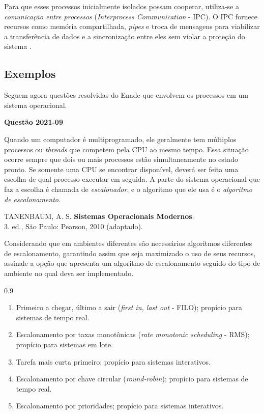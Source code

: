 \documentclass[12pt,a4paper]{article}
\newenvironment{Question}[1]{%
    \pdfbookmark[3]{Questão #1}{q:#1}
    \label{q:#1}
    \par\bigskip\noindent
    \textbf{Questão #1} \dotfill
    \par\noindent
    \nopagebreak
    \ignorespaces
}{%
    \noindent\dotfill
}
\newenvironment{QuestionOptions}{%
    \begin{spacing}{0.9}%
    \small
    \begin{enumerate}[label=\Alph*)]
}{%
    \end{enumerate}
    \end{spacing}
}
\begin{document}
Para que esses processos inicialmente isolados possam cooperar,
utiliza-se a \emph{comunicação entre processos} (\textit{Interprocess Communication} - IPC).
O IPC fornece recursos como memória compartilhada, \textit{pipes} e troca de mensagens
para viabilizar a transferência de dados e a sincronização entre eles sem violar a proteção do sistema \parencite[seç.~2.3]{tanenbaum2016}.

\subsection{Exemplos}
Seguem agora questões resolvidas do Enade que envolvem os processos em um sistema operacional.

\begin{Question}{2021-09}
Quando um computador é multiprogramado, ele geralmente tem múltiplos processos ou \textit{threads} que competem pela CPU ao mesmo tempo.
Essa situação ocorre sempre que dois ou mais processos estão simultaneamente no estado pronto.
Se somente uma CPU se encontrar disponível, deverá ser feita uma escolha de qual processo executar em seguida.
A parte do sistema operacional que faz a escolha é chamada de \emph{escalonador},
e o algoritmo que ele usa é o \emph{algoritmo de escalonamento}.
\vspace{-0.5em}
\begin{flushright}
    \scriptsize
    TANENBAUM, A. S. \textbf{Sistemas Operacionais Modernos}.\\
    3. ed., São Paulo: Pearson, 2010 (adaptado).
\end{flushright}
Considerando que em ambientes diferentes são necessários algoritmos diferentes de escalonamento,
garantindo assim que seja maximizado o uso de seus recursos,
assinale a opção que apresenta um algoritmo de escalonamento seguido do tipo de ambiente no qual deva ser implementado.
\begin{QuestionOptions}
    \item Primeiro a chegar, último a sair (\textit{first in, last out} - FILO); propício para sistemas de tempo real.
    \item Escalonamento por taxas monotônicas (\textit{rate monotonic scheduling} - RMS); propício para sistemas em lote.
    \item Tarefa mais curta primeiro; propício para sistemas interativos.
    \item Escalonamento por chave circular (\textit{round-robin}); propício para sistemas de tempo real.
    \item Escalonamento por prioridades; propício para sistemas interativos.
\end{QuestionOptions}
\end{Question}
\end{document}
